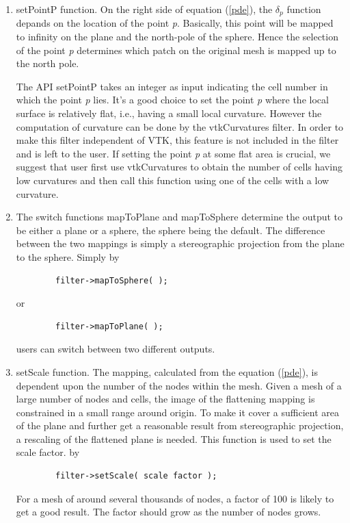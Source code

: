 \documentclass{InsightArticle}
\begin{document}
	\begin{enumerate}
	\item setPointP function. On the right side of equation (\ref{pde}), the $\delta_p$ function
	depands on the location of the point \emph{p}. Basically, this point
	will be mapped to infinity on the plane and the north-pole of the
	sphere. Hence the selection of the point \emph{p} determines which
	patch on the original mesh is mapped up to the north pole.

	The API setPointP takes an integer as input indicating the cell number
	in which the point \emph{p} lies. It's a good choice to set the point
	\emph{p} where the local surface is relatively flat, i.e., having a
	small local curvature. However the computation of curvature can be
	done by the vtkCurvatures filter. In order to make this filter
	independent of VTK, this feature is not included in the filter and is
	left to the user. If setting the point \emph{p} at some flat area is
	crucial, we suggest that user first use vtkCurvatures to obtain the
	number of cells having low curvatures and then call this function
	using one of the cells with a low curvature.

	\item The switch functions mapToPlane and mapToSphere determine the
	output to be either a plane or a sphere, the sphere being the
	default. The difference between the two mappings is simply a
	stereographic projection from the plane to the sphere. Simply by
	\begin{verbatim}
		filter->mapToSphere( ); 
	\end{verbatim}
	or
	\begin{verbatim}
		filter->mapToPlane( ); 
	\end{verbatim}
	users can switch between two different outputs.
	
	\item setScale function. The mapping, calculated from the equation
	(\ref{pde}), is dependent upon the number of the nodes within the
	mesh. Given a mesh of a large number of nodes and cells, the image
	of the flattening mapping is constrained in a small range around
	origin. To make it cover a sufficient area of the plane and further
	get a reasonable result from stereographic projection, a rescaling
	of the flattened plane is needed. This function is used to set the
	scale factor. by
	\begin{verbatim}
		filter->setScale( scale factor ); 
	\end{verbatim}
	For a mesh of around several thousands of nodes, a factor of 100 is
	likely to get a good result. The factor should grow as the number of
	nodes grows.
	\end{enumerate}
\end{document}
